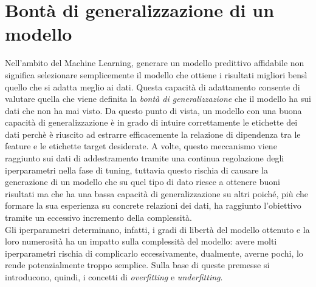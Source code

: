 \documentclass[12pt]{report}
\theoremstyle{definition}
\begin{document}
\section{Bontà di generalizzazione di un modello}\label{generalization}
Nell'ambito del Machine Learning, generare un modello predittivo affidabile non significa selezionare semplicemente il modello che ottiene i risultati migliori bensì quello che si adatta meglio ai dati.
Questa capacità di adattamento consente di valutare quella che viene definita la \textit{bontà di generalizzazione} che il modello ha sui dati che non ha mai visto. Da questo punto di vista, un modello con una buona capacità di generalizzazione è in grado di intuire correttamente le etichette dei dati perchè è riuscito ad estrarre efficacemente la relazione di dipendenza tra le feature e le etichette target desiderate.
A volte, questo meccanismo viene raggiunto sui dati di addestramento tramite una continua regolazione degli iperparametri nella fase di tuning, tuttavia questo rischia di causare la generazione di un modello che su quel tipo di dato riesce a ottenere buoni risultati ma che ha una bassa capacità di generalizzazione su altri poiché, più che formare la sua esperienza su concrete relazioni dei dati, ha raggiunto l'obiettivo tramite un eccessivo incremento della complessità.
\\
Gli iperparametri determinano, infatti, i gradi di libertà del modello ottenuto e la loro numerosità ha un impatto sulla complessità del modello: avere molti iperparametri rischia di complicarlo eccessivamente, dualmente, averne pochi, lo rende potenzialmente troppo semplice. 
Sulla base di queste premesse si introducono, quindi, i concetti di \textit{overfitting} e \textit{underfitting}.
\end{document}
